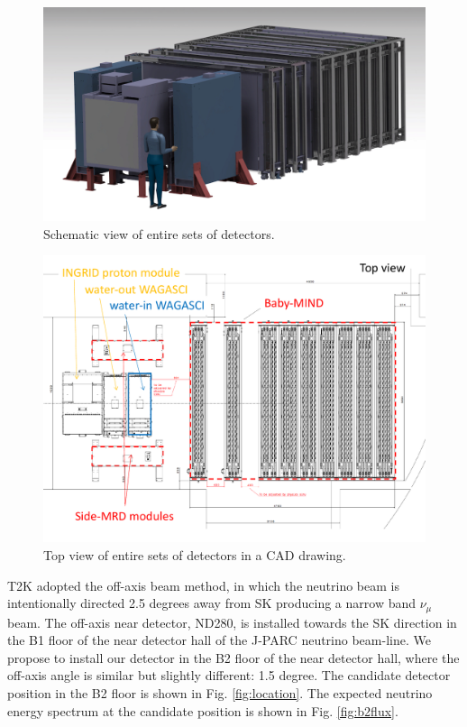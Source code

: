 \begin{figure}[tbh]
\begin{center}
\includegraphics[width=0.8\linewidth]{fig/wagasci_smrd_babymind.pdf}
\end{center}
\caption{
Schematic view of entire sets of detectors.
}
\label{fig:all_detector}
\end{figure}

\begin{figure}[tbh]
\begin{center}
\includegraphics[width=0.8\linewidth]{fig/wagasci_smrd_babymind_topview.pdf}
\end{center}
\caption{
Top view of entire sets of detectors in a CAD drawing.
}
\label{fig:all_detector_topview}
\end{figure}


T2K adopted the off-axis beam method, in which
the neutrino beam is intentionally directed 2.5 degrees away from SK producing a narrow band $\nu_{\mu}$ beam.
The off-axis near detector, ND280, is installed towards the SK direction in the B1 floor of the near detector hall of the J-PARC neutrino beam-line.
We propose to install our detector in the B2 floor of the near detector hall, 
where the off-axis angle is similar but slightly different: 1.5 degree.
The candidate detector position in the B2 floor is shown in Fig. \ref{fig:location}.
The expected neutrino energy spectrum at the candidate position is shown in Fig. \ref{fig:b2flux}.

